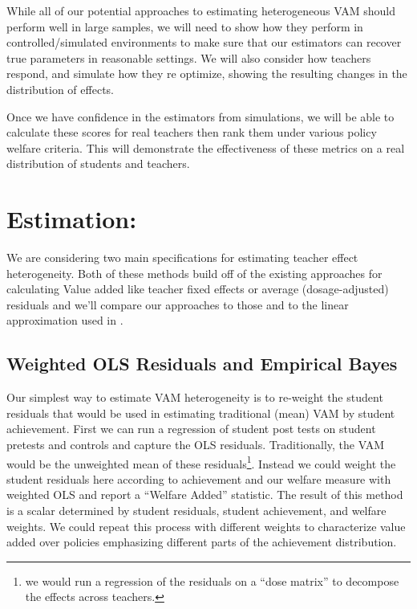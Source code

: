 \documentclass[letterpaper,12pt]{article}
\begin{document}
While all of our potential approaches to estimating heterogeneous VAM should perform well in large samples, we will need to show how they perform in controlled/simulated environments to make sure that our estimators can recover true parameters in reasonable settings. We will also consider how teachers respond, and simulate how they re optimize, showing the resulting changes in the distribution of effects.

Once we have confidence in the estimators from simulations, we will be able to calculate these scores for real teachers then rank them under various policy welfare criteria. This will demonstrate the effectiveness of these metrics on a real distribution of students and teachers. 




\section{Estimation:}
We are considering two main specifications for estimating teacher effect heterogeneity. Both of these methods build off of the existing approaches for calculating Value added like teacher fixed effects or average (dosage-adjusted) residuals and we'll compare our approaches to those and to the linear approximation used in \citet{lockwood2007sensitivity}.


\subsection{Weighted OLS Residuals and Empirical Bayes}
Our simplest way to estimate VAM heterogeneity is to re-weight the student residuals that would be used in estimating traditional (mean) VAM by student achievement. First we can run a regression of student post tests on student pretests and controls and capture the OLS residuals. Traditionally, the VAM would be the unweighted mean of these residuals\footnote{we would run a regression of the residuals on a ``dose matrix'' to decompose the effects across teachers.}. Instead  we could weight the student residuals here according to achievement and our welfare measure with weighted OLS and report a ``Welfare Added'' statistic. The result of this method is a scalar determined by student residuals, student achievement, and welfare weights. We could repeat this process with different weights to characterize value added over policies emphasizing different parts of the achievement distribution.
\end{document}
